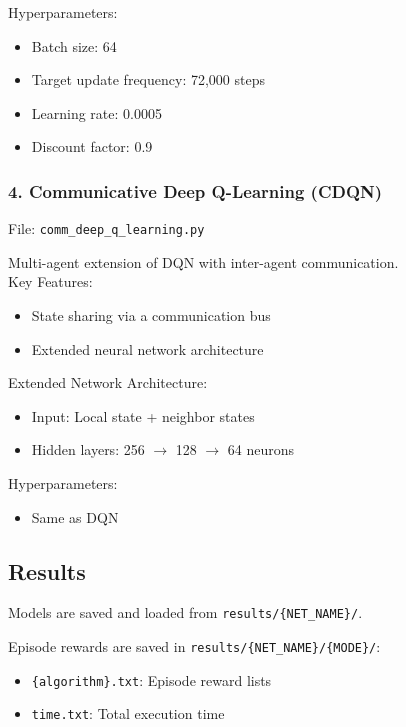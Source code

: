 \documentclass[a4paper]{report}
\begin{document}
\noindent
Hyperparameters:
\begin{itemize}
    \item Batch size: 64
    \item Target update frequency: 72,000 steps
    \item Learning rate: 0.0005
    \item Discount factor: 0.9
\end{itemize}

\subsubsection{4. Communicative Deep Q-Learning (CDQN)}

File: \texttt{comm\_deep\_q\_learning.py}

\noindent
Multi-agent extension of DQN with inter-agent communication.
\\

\noindent
Key Features:
\begin{itemize}
    \item State sharing via a communication bus
    \item Extended neural network architecture
\end{itemize}

\noindent
Extended Network Architecture:
\begin{itemize}
    \item Input: Local state + neighbor states
    \item Hidden layers: 256 $\to$ 128 $\to$ 64 neurons
\end{itemize}

\noindent
Hyperparameters:
\begin{itemize}
    \item Same as DQN
\end{itemize}

\subsection{Results}

Models are saved and loaded from \texttt{results/\{NET\_NAME\}/}.

\noindent
Episode rewards are saved in \texttt{results/\{NET\_NAME\}/\{MODE\}/}:
\begin{itemize}
    \item \texttt{\{algorithm\}.txt}: Episode reward lists
    \item \texttt{time.txt}: Total execution time
\end{itemize}
\end{document}
